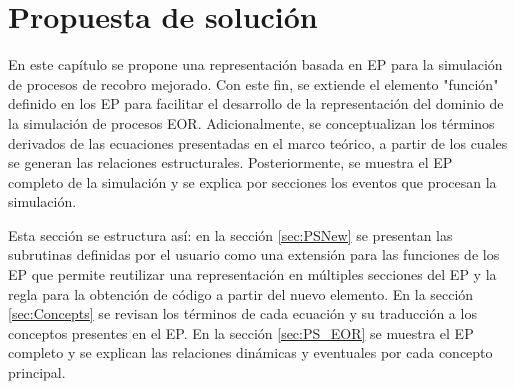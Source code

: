 \chapter{Propuesta de solución}
En este capítulo se propone una representación basada en EP para la simulación de procesos de recobro mejorado. Con este fin, se extiende el elemento "función" definido en los EP para facilitar el desarrollo de la representación del dominio de la simulación de procesos EOR. Adicionalmente, se conceptualizan los términos derivados de las ecuaciones presentadas en el marco teórico, a partir de los cuales se generan las relaciones estructurales. Posteriormente, se muestra el EP completo de la simulación y se explica por secciones los eventos que procesan la simulación.

Esta sección se estructura así: en la sección \ref{sec:PSNew} se presentan las subrutinas definidas por el usuario como una extensión para las funciones de los EP que permite reutilizar una representación en múltiples secciones del EP y la regla para la obtención de código a partir del nuevo elemento. En la sección \ref{sec:Concepts} se revisan los términos de cada ecuación y su traducción a los conceptos presentes en el EP. En la sección \ref{sec:PS_EOR} se muestra el EP completo y se explican las relaciones dinámicas y eventuales por cada concepto principal.


